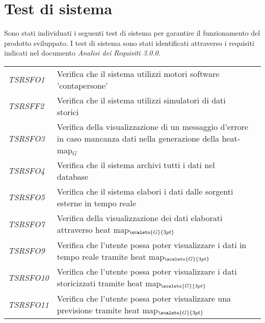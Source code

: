 \section{Test di sistema}\label{SpecificaDeiTestTestDiSistema}
Sono stati individuati i seguenti test di sistema per garantire il funzionamento del prodotto sviluppato. I test di sistema sono stati identificati attraverso i requisiti indicati nel documento \textit{Analisi dei Requisiti 3.0.0}. 
\def\tabularxcolumn#1{m{#1}}
{
	
	\begin{center}
		\renewcommand{\arraystretch}{1.4}
		\begin{longtable}{|p{3cm}|p{8cm}|p{3cm}|}
			\hline
			\rowcolor{airforceblue}
			\makecell[c]{\textbf{Id Test}} & \makecell[c]{\textbf{Descrizione}} & \makecell[c]{\textbf{Esito}} \\
			\hline
			\textit{TSRSFO1} & Verifica che il sistema utilizzi motori software 'contapersone' & \makecell[tc]{\textit{NI}} \\
			\hline
			\textit{TSRSFF2} & Verifica che il sistema utilizzi simulatori di dati storici & \makecell[tc]{\textit{NI}}\\
			\hline
			\textit{TSRSFO3} & Verifica della visualizzazione di un messaggio d'errore in caso mancanza dati nella generazione della heat-map$_G$ &\makecell[tc]{\textit{NI}}\\
			\hline
			\textit{TSRSFO4} & Verifica che il sistema archivi tutti i dati nel database & \makecell[tc]{\textit{NI}}\\
			\hline
			\textit{TSRSFO5} & Verifica che il sistema elabori i dati dalle sorgenti esterne in tempo reale & \makecell[tc]{\textit{NI}}\\
			\hline
			\textit{TSRSFO7} & Verifica della visualizzazione dei dati elaborati attraverso heat map$_{\scaleto{G}{3pt}}$ & \makecell[tc]{\textit{NI}}\\
			\hline
			\textit{TSRSFO9} & Verifica che l’utente possa poter visualizzare i dati in tempo reale tramite heat map$_{\scaleto{G}{3pt}}$ & \makecell[tc]{\textit{NI}}\\
			\hline
			\textit{TSRSFO10} & Verifica che l’utente possa poter visualizzare i dati storicizzati tramite heat map$_{\scaleto{G}{3pt}}$ & \makecell[tc]{\textit{NI}}\\
			\hline
			\textit{TSRSFO11} & Verifica che l’utente possa poter visualizzare una previsione tramite heat map$_{\scaleto{G}{3pt}}$ & \makecell[tc]{\textit{NI}}\\

\end{longtable}
\end{center}}

